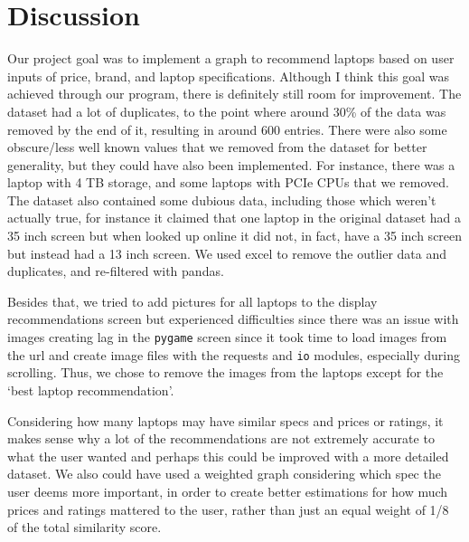 \documentclass{article}
\begin{document}
\section{Discussion}
\par Our project goal was to implement a graph to recommend laptops based on user inputs of price, brand, and laptop specifications. Although I think this goal was achieved through our program, there is definitely still room for improvement. The dataset had a lot of duplicates, to the point where around 30\% of the data was removed by the end of it, resulting in around 600 entries. There were also some obscure/less well known values that we removed from the dataset for better generality, but they could have also been implemented. For instance, there was a laptop with 4 TB storage, and some laptops with PCIe CPUs that we removed. The dataset also contained some dubious data, including those which weren’t actually true, for instance it claimed that one laptop in the original dataset had a 35 inch screen but when looked up online it did not, in fact, have a 35 inch screen but instead had a 13 inch screen. We used excel to remove the outlier data and duplicates, and re-filtered with pandas. 
\\
\par Besides that, we tried to add pictures for all laptops to the display recommendations screen but experienced difficulties since there was an issue with images creating lag in the \texttt{pygame} screen since it took time to load images from the url and create image files with the requests and \texttt{io} modules, especially during scrolling. Thus, we chose to remove the images from the laptops except for the ‘best laptop recommendation’.
\\
\par Considering how many laptops may have similar specs and prices or ratings, it makes sense why a lot of the recommendations are not extremely accurate to what the user wanted and perhaps this could be improved with a more detailed dataset. We also could have used a weighted graph considering which spec the user deems more important, in order to create better estimations for how much prices and ratings mattered to the user, rather than just an equal weight of 1/8 of the total similarity score. 
\\ 
\end{document}

